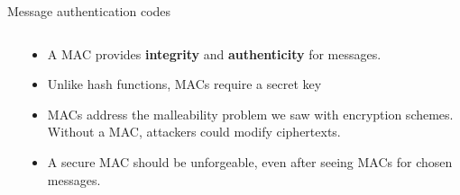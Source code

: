 \documentclass[aspectratio=169, lualatex, handout]{beamer}
\begin{document}
\begin{frame}{Message authentication codes}
	\begin{columns}[c]
		\begin{column}{0.5\textwidth}
		\end{column}
		\begin{column}{0.5\textwidth}
			\begin{itemize}[<+->]
				\item A MAC provides \textbf{integrity} and \textbf{authenticity} for messages.
				\item Unlike hash functions, MACs require a secret key
				\item MACs address the malleability problem we saw with encryption schemes. Without a MAC, attackers could modify ciphertexts.
				\item A secure MAC should be unforgeable, even after seeing MACs for chosen messages.
			\end{itemize}
		\end{column}
	\end{columns}
\end{frame}
\end{document}
